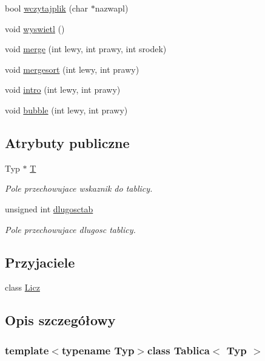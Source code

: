 \begin{DoxyCompactItemize}
bool \hyperlink{class_tablica_a0c9690c0fff4d5a704318ae93f264b0f}{wczytajplik} (char $\ast$nazwapl)
\item 
void \hyperlink{class_tablica_acdaaf0758537334d35779497a1d60900}{wyswietl} ()
\item 
void \hyperlink{class_tablica_a045ff88c70192a28c4fc4fd7585cad42}{merge} (int lewy, int prawy, int srodek)
\item 
void \hyperlink{class_tablica_a10405980a5d57f53ce38fa91fae0a38b}{mergesort} (int lewy, int prawy)
\item 
void \hyperlink{class_tablica_aac9cef276e6db6746cd57f3fa08ee9a6}{intro} (int lewy, int prawy)
\item 
void \hyperlink{class_tablica_a5f6d42f9f1da7aeca51618f25532e2aa}{bubble} (int lewy, int prawy)
\end{DoxyCompactItemize}
\subsection*{Atrybuty publiczne}
\begin{DoxyCompactItemize}
\item 
Typ $\ast$ \hyperlink{class_tablica_a8a186bd43f434e2c8b58377f6a54ab47}{T}
\begin{DoxyCompactList}\small\item\em Pole przechowujace wskaznik do tablicy. \end{DoxyCompactList}\item 
unsigned int \hyperlink{class_tablica_a42b49425f0e086c4e958337dcba3a3b6}{dlugosctab}
\begin{DoxyCompactList}\small\item\em Pole przechowujace dlugosc tablicy. \end{DoxyCompactList}\end{DoxyCompactItemize}
\subsection*{Przyjaciele}
\begin{DoxyCompactItemize}
\item 
class \hyperlink{class_tablica_a6c89297f43089edbc61582d7315b1a3c}{Licz}
\end{DoxyCompactItemize}


\subsection{Opis szczegółowy}
\subsubsection*{template$<$typename Typ$>$class Tablica$<$ Typ $>$}

